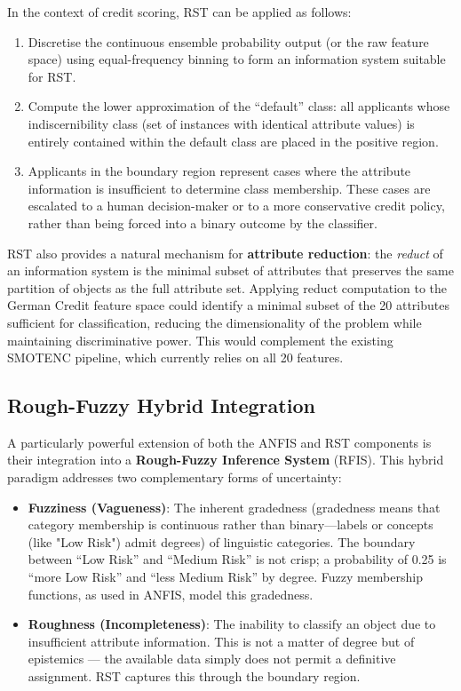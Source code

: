\documentclass[12pt,a4paper]{article}
\begin{document}
In the context of credit scoring, RST can be applied as follows:
\begin{enumerate}
    \item Discretise the continuous ensemble probability output (or the raw feature space) using equal-frequency binning to form an information system suitable for RST.
    \item Compute the lower approximation of the ``default'' class: all applicants whose indiscernibility class (set of instances with identical attribute values) is entirely contained within the default class are placed in the positive region.
    \item Applicants in the boundary region represent cases where the attribute information is insufficient to determine class membership. These cases are escalated to a human decision-maker or to a more conservative credit policy, rather than being forced into a binary outcome by the classifier.
\end{enumerate}

RST also provides a natural mechanism for \textbf{attribute reduction}: the \textit{reduct} of an information system is the minimal subset of attributes that preserves the same partition of objects as the full attribute set. Applying reduct computation to the German Credit feature space could identify a minimal subset of the 20 attributes sufficient for classification, reducing the dimensionality of the problem while maintaining discriminative power. This would complement the existing SMOTENC pipeline, which currently relies on all 20 features.

\subsection{Rough-Fuzzy Hybrid Integration}

A particularly powerful extension of both the ANFIS and RST components is their integration into a \textbf{Rough-Fuzzy Inference System} (RFIS). This hybrid paradigm addresses two complementary forms of uncertainty:

\begin{itemize}
    \item \textbf{Fuzziness (Vagueness)}: The inherent gradedness (gradedness means that category membership is continuous rather than binary—labels or concepts (like "Low Risk") admit degrees) of linguistic categories. The boundary between ``Low Risk'' and ``Medium Risk'' is not crisp; a probability of 0.25 is ``more Low Risk'' and ``less Medium Risk'' by degree. Fuzzy membership functions, as used in ANFIS, model this gradedness.
    \item \textbf{Roughness (Incompleteness)}: The inability to classify an object due to insufficient attribute information. This is not a matter of degree but of epistemics — the available data simply does not permit a definitive assignment. RST captures this through the boundary region.
\end{itemize}
\end{document}
